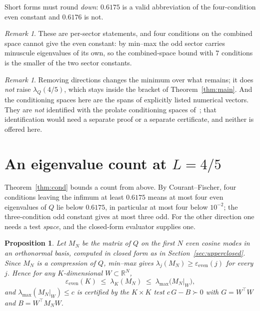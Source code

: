 \documentclass[11pt,a4paper]{article}
\newtheorem{proposition}[theorem]{Proposition}
\theoremstyle{definition}
\theoremstyle{remark}
\newtheorem{remark}[theorem]{Remark}
\newcommand{\lQ}{\lambda_{Q}}
\begin{document}
Short forms must round \emph{down}: $0.6175$ is a valid abbreviation of the
four-condition even constant and $0.6176$ is not.

\begin{remark}
These are per-sector statements, and four conditions on the combined space
cannot give the even constant: by min--max the odd sector carries minuscule
eigenvalues of its own, so the combined-space bound with $7$ conditions is the
smaller of the two sector constants.
\end{remark}

\begin{remark}
\label{rem:notprolate}
Removing directions changes the minimum over what remains; it does \emph{not}
raise $\lQ(4/5)$, which stays inside the bracket of Theorem~\ref{thm:main}. And
the conditioning spaces here are the spans of explicitly listed numerical
vectors. They are \emph{not} identified with the prolate conditioning spaces
of~\cite[\S5.3]{ACLG}; that identification would need a separate proof or a
separate certificate, and neither is offered here.
\end{remark}

\section{An eigenvalue count at $L = 4/5$}
\label{sec:count}

Theorem~\ref{thm:cond} bounds a count from above. By Courant--Fischer, four
conditions leaving the infimum at least $0.6175$ means at most four even
eigenvalues of $Q$ lie below $0.6175$, in particular at most four below
$10^{-2}$; the three-condition odd constant gives at most three odd. For the
other direction one needs a test \emph{space}, and the closed-form evaluator
supplies one.

\begin{proposition}
\label{prop:count}
Let $M_N$ be the matrix of $Q$ on the first $N$ even cosine modes in an
orthonormal basis, computed in closed form as in Section~\ref{sec:upperclosed}.
Since $M_N$ is a compression of $Q$, min--max gives
$\lambda_j(M_N) \ge \varepsilon_{\mathrm{even}}(j)$ for every $j$. Hence for any
$K$-dimensional $W \subset \mathbb{R}^N$,
\[
   \varepsilon_{\mathrm{even}}(K) \;\le\; \lambda_K(M_N)
   \;\le\; \lambda_{\max}\!\big(M_N|_W\big) ,
\]
and $\lambda_{\max}(M_N|_W) \le c$ is certified by the $K \times K$ test
$c\,G - B \succ 0$ with $G = W^{\!\top}W$ and $B = W^{\!\top}M_N W$.
\end{proposition}
\end{document}
